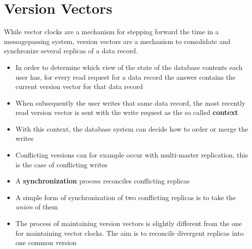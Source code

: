 \section{Version Vectors}
\begin{tcolorbox}
While vector clocks are a mechanism for stepping forward the time in a messagepassing system, version vectors are a mechanism to consolidate and synchronize several replicas of a data record.
\end{tcolorbox}
\begin{itemize}
    \item In order to determine which view of the state of the database contents each user has, for every read request for a data record the answer contains the current version vector for that data record
    \item When subsequently the user writes that same data record, the most recently read version vector is sent with the write request as the so called \textbf{context}
    \item With this context, the database system can decide how to order or merge the writes
    \item Conflicting versions can for example occur with multi-master replication, this is the case of conflicting writes
    \item A \textbf{synchronization} process reconciles conflicting replicas
    \item A simple form of synchronization of two conflicting replicas is to take the \textit{union} of them
    \item The process of maintaining version vectors is slightly different from the one for maintaining vector clocks. The aim is to reconcile divergent replicas into one common version
\end{itemize}


